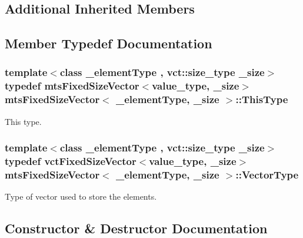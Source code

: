 \subsection*{Additional Inherited Members}


\subsection{Member Typedef Documentation}
\hypertarget{classmts_fixed_size_vector_afdc3f321836a8df42be6bed595148de7}{}
\subsubsection[{This\+Type}]{\setlength{\rightskip}{0pt plus 5cm}template$<$class \+\_\+element\+Type , vct\+::size\+\_\+type \+\_\+size$>$ typedef {\bf mts\+Fixed\+Size\+Vector}$<$value\+\_\+type, \+\_\+size$>$ {\bf mts\+Fixed\+Size\+Vector}$<$ \+\_\+element\+Type, \+\_\+size $>$\+::{\bf This\+Type}}\label{classmts_fixed_size_vector_afdc3f321836a8df42be6bed595148de7}
This type. \hypertarget{classmts_fixed_size_vector_ac5c774708b6dab6c0fe332c5fcd2c5ad}{}
\subsubsection[{Vector\+Type}]{\setlength{\rightskip}{0pt plus 5cm}template$<$class \+\_\+element\+Type , vct\+::size\+\_\+type \+\_\+size$>$ typedef {\bf vct\+Fixed\+Size\+Vector}$<$value\+\_\+type, \+\_\+size$>$ {\bf mts\+Fixed\+Size\+Vector}$<$ \+\_\+element\+Type, \+\_\+size $>$\+::{\bf Vector\+Type}}\label{classmts_fixed_size_vector_ac5c774708b6dab6c0fe332c5fcd2c5ad}
Type of vector used to store the elements. 

\subsection{Constructor \& Destructor Documentation}
\hypertarget{classmts_fixed_size_vector_a67b73e64d28ba115f404a75885d38fbd}{}
